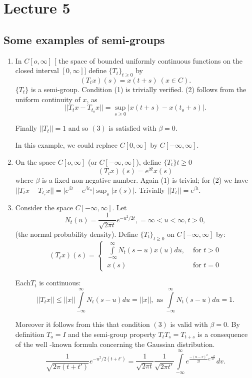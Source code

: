 \chapter{Lecture 5}\label{chap5}

\section{Some examples of semi-groups}\label{chap5:sec1}\pageoriginale

\begin{enumerate}[I]
\item In $C[o, \infty]$ [ the space of bounded uniformly continuous
 functions on the closed interval $[0, \infty]$] define $
 \big\{T_t\big\}_{t \geq 0}$ by 
 $$
 (T_t x)(s) = x(t +s)~ (x \in C). 
 $$
 $\big\{ T_t \big\}$ is a semi-group. Condition (1) is trivially
 verified. (2) follows from the uniform continuity of $x$, as 
 $$
 || T_t x - T_{t_o} x || = \sup_{s \geq 0} | x (t + s ) - x (t_o + s )|.
 $$

 Finally $|| T_t || = 1 $ and so $(3)$ is satisfied with $\beta = 0$. 
 
 In this example, we could replace $C[ 0, \infty]$ by $C[ -\infty,
  \infty] $. 
\item On the space $C [ o, \infty]$ (or $C[ -\infty, \infty]$),
 define $\big\{T_t \big\} t \geq 0$ 
 $$
 (T_t x ) (s) = e^{\beta t} x(s)
 $$
 where $\beta$ is a fixed non-negative number. Again (1) is
 trivial; for (2) we have $|| T_t x - T_{t_\circ} x || = \big|
 e^{\beta t } - e^{ \beta t_o}\big| \sup_s | x(s) | $. Trivially $||
 T_t || = e^{ \beta t}$. 
\item Consider the space $C[ -\infty, \infty]$. Let 
 $$
 N_t (u) = \frac{1}{\sqrt{ 2 \pi t}} e^{-u^{2}/2t}, =\infty < u <
 \infty, t > 0, 
 $$
 (the normal probability density). Define $\big\{ T_t \big\}_{t\geq
  0}$ on $C[ -\infty, \infty]$ by: 
 $$
 (T_t x )(s) = 
 \begin{cases}
  ~\int\limits_{-\infty}^{ \infty} N_t (s - u) x(u) du, &\text { for
  } t > 0\\ 
  ~x(s) & \text{ for } t = 0
 \end{cases}
 $$
 
 Each\pageoriginale $T_t$ is continuous:
 $$
 || T_t x || \leq || x || \int\limits^\infty_{- \infty} N_t (s - u )
 du = || x||, \text{ as } \int\limits^\infty_{- \infty} N_t (s - u )
 du = 1. 
 $$

 Moreover it follows from this that condition $(3)$ is valid with
 $\beta = 0$. By definition $T_o = I$ and the semi-group property
 $T_t T_s = T_{ t+s}$ is a consequence of the well -known formula
 concerning the Gaussian distribution. 
 $$
 \frac{1}{\sqrt{ 2 \pi (t +t ')}} e^{ -u^2 / 2 (t + t')} =
 \frac{1}{\sqrt{ 2 \pi t}} \frac{1}{\sqrt{ 2 \pi t'}} \int\limits_{ -
  \infty}^{ \infty} e^{\frac{-( u -v )^2}{2t} e^{ \frac{- v^2}{2t'}}}dv. 
 $$
 

\end{enumerate}
